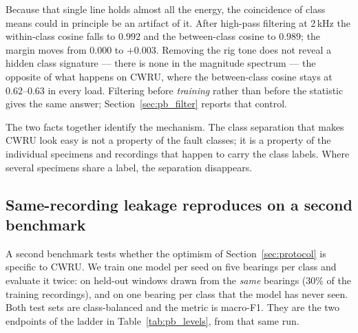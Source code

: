 \documentclass[preprint,12pt]{elsarticle}
\begin{document}
Because that single line holds almost all the energy, the coincidence of class
means could in principle be an artifact of it. After high-pass filtering at
2\,kHz the within-class cosine falls to $0.992$ and the between-class cosine to
$0.989$; the margin moves from $0.000$ to $+0.003$. Removing the rig tone does
not reveal a hidden class signature --- there is none in the magnitude
spectrum --- the opposite of what happens on CWRU, where the between-class
cosine stays at $0.62$--$0.63$ in every load. Filtering before \emph{training}
rather than before the statistic gives the same answer;
Section~\ref{sec:pb_filter} reports that control.

The two facts together identify the mechanism. The class separation that makes
CWRU look easy is not a property of the fault classes; it is a property of the
individual specimens and recordings that happen to carry the class labels. Where
several specimens share a label, the separation disappears.

\subsection{Same-recording leakage reproduces on a second benchmark}

A second benchmark tests whether the optimism of
Section~\ref{sec:protocol} is specific to CWRU. We train one model per seed on
five bearings per class and evaluate it twice: on held-out windows drawn from the \emph{same} bearings
($30\%$ of the training recordings), and on one bearing per class that the model
has never seen. Both test sets are class-balanced and the metric is macro-F1.
They are the two endpoints of the ladder in
Table~\ref{tab:pb_levels}, from that same run.

\begin{table}[t]
\centering
\caption{Same-recording versus bearing-disjoint evaluation on Paderborn
(condition N15\_M07\_F10, three classes, 5 training bearings per class, 200
epochs, ten seeds, macro-F1). The training set is files 1--4 of the training
bearings; the same-recording test set is its held-out $30\%$ of windows. All
ten runs are included, including the one that did not converge (see the text
below).}
\label{tab:pb_leak}
\small
{}
\end{table}
\end{document}
